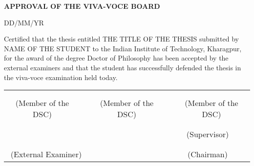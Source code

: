 
\thispagestyle{empty}
\begin{center}
\textbf{\large APPROVAL OF THE VIVA-VOCE BOARD}
\end{center}
\begin{flushright}
DD/MM/YR
\end{flushright}
Certified that the thesis entitled THE TITLE OF THE THESIS submitted by NAME OF THE STUDENT to the Indian Institute of Technology, Kharagpur, for the award of the degree Doctor of Philosophy has been accepted by the external examiners and that the student has successfully defended the thesis in the viva-voce examination held today.
\begin{center}
\begin{tabular*}{\textwidth}{@{\extracolsep{\fill}}cccccccc}
&&&&&&&\\
&&&&&&&\\
\multicolumn{2}{c}{(Member of the DSC)} && \multicolumn{2}{c}{(Member of the DSC)} && \multicolumn{2}{c}{(Member of the DSC)}\\
&&&&&&&\\
&&&&&&&\\
\multicolumn{3}{c}{} &&& \multicolumn{3}{c}{(Supervisor)}\\
&&&&&&&\\
&&&&&&&\\
\multicolumn{3}{c}{(External Examiner)} &&& \multicolumn{3}{c}{(Chairman)}\\
\end{tabular*}
\end{center}

\newpage
\thispagestyle{empty}
\cleardoublepage


